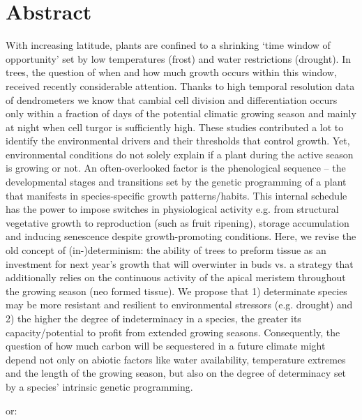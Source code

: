 \documentclass{article}
\begin{document}
	
	\newpage
	
	\section*{Abstract} %
	
	With increasing latitude, plants are confined to a shrinking ‘time window of opportunity’ set by low temperatures (frost) and water restrictions (drought). In trees, the question of when and how much growth occurs within this window, received recently considerable attention. Thanks to high temporal resolution data of dendrometers we know that cambial cell division and differentiation occurs only within a fraction of days of the potential climatic growing season and mainly at night when cell turgor is sufficiently high. These studies contributed a lot to identify the environmental drivers and their thresholds that control growth. 
	Yet, environmental conditions do not solely explain if a plant during the active season is growing or not. An often-overlooked factor is the phenological sequence – the developmental stages and transitions set by the genetic programming of a plant that manifests in species-specific growth patterns/habits. This internal schedule has the power to impose switches in physiological activity e.g. from structural vegetative growth to reproduction (such as fruit ripening), storage accumulation and inducing senescence despite growth-promoting conditions.
	Here, we revise the old concept of (in-)determinism: the ability of trees to preform tissue as an investment for next year’s growth that will overwinter in buds vs. a strategy that additionally relies on the continuous activity of the apical meristem throughout the growing season (neo formed tissue). We propose that 1) determinate species may be more resistant and resilient to environmental stressors (e.g. drought) and 2) the higher the degree of indeterminacy in a species, the greater its capacity/potential to profit from extended growing seasons. Consequently, the question of how much carbon will be sequestered in a future climate might depend not only on abiotic factors like water availability, temperature extremes and the length of the growing season, but also on the degree of determinacy set by a species' intrinsic genetic programming.
	
	or:
	
\end{document}
